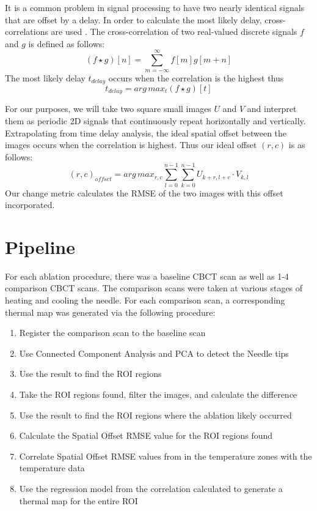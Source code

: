 \documentclass[]{spie}  %
\begin{document}
It is a common problem in signal processing to have two nearly identical signals that are offset by a delay. In order to calculate the most likely delay, cross-correlations are used \cite{Rhudy09}. The cross-correlation of two real-valued discrete signals $f$ and $g$ is defined as follows:
\[
(f \star g)[n] = \sum_{m=-\infty}^{\infty}{f[m]g[m+n]}
\]
The most likely delay $t_{delay}$ occurs when the correlation is the highest thus
\[
t_{delay} = arg\,max_t (f \star g)[t]
\]

For our purposes, we will take two square small images $U$ and $V$ and interpret them as periodic 2D signals that continuously repeat horizontally and vertically. Extrapolating from time delay analysis, the ideal spatial offset between the images occurs when the correlation is highest. Thus our ideal offset $(r,c)$ is as follows:
\[
(r,c)_{offset} = arg\,max_{r,c} \sum_{l=0}^{n-1} \sum_{k=0}^{n-1} {U_{k+r,l+c} \cdot V_{k,l}}
\]
Our change metric calculates the RMSE of the two images with this offset incorporated.


\section{Pipeline}

For each ablation procedure, there was a baseline CBCT scan as well as 1-4 comparison CBCT scans. The comparison scans were taken at various stages of heating and cooling the needle. For each comparison scan, a corresponding thermal map was generated via the following procedure:
\begin{enumerate}
\item Register the comparison scan to the baseline scan
\item Use Connected Component Analysis and PCA to detect the Needle tips
\item Use the result to find the ROI regions
\item Take the ROI regions found, filter the images, and calculate the difference
\item Use the result to find the ROI regions where the ablation likely occurred
\item Calculate the Spatial Offset RMSE value for the ROI regions found
\item Correlate Spatial Offset RMSE values from in the temperature zones with the temperature data
\item Use the regression model from the correlation calculated to generate a thermal map for the entire ROI
\end{enumerate}
\end{document}
